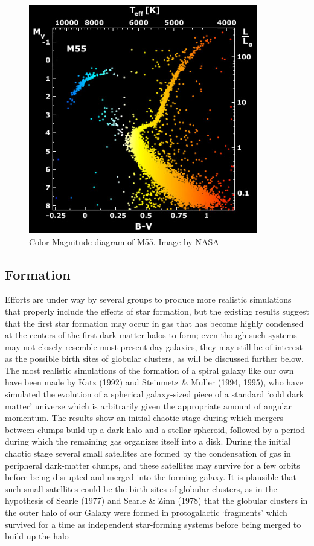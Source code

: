 \begin{figure}[H]
\centering
\includegraphics[width=10cm]{images/m55_diagram.jpg}
\caption{Color Magnitude diagram of M55. Image by NASA}
\end{figure}

\subsection{Formation}

Efforts are under way by several
groups to produce more realistic simulations that properly include the effects
of star formation, but the existing results suggest that the first star formation
may occur in gas that has become highly condensed at the centers of the first
dark-matter halos to form; even though such systems may not closely resemble
most present-day galaxies, they may still be of interest as the possible birth sites
of globular clusters, as will be discussed further below.
The most realistic simulations of the formation of a spiral galaxy like our
own have been made by Katz (1992) and Steinmetz \& Muller (1994, 1995),
who have simulated the evolution of a spherical galaxy-sized piece of a standard
‘cold dark matter’ universe which is arbitrarily given the appropriate amount
of angular momentum. The results show an initial chaotic stage during which
mergers between clumps build up a dark halo and a stellar spheroid, followed by
a period during which the remaining gas organizes itself into a disk. During the
initial chaotic stage several small satellites are formed by the condensation of
gas in peripheral dark-matter clumps, and these satellites may survive for a few
orbits before being disrupted and merged into the forming galaxy. It is plausible
that such small satellites could be the birth sites of globular clusters, as in the
hypothesis of Searle (1977) and Searle \& Zinn (1978) that the globular clusters
in the outer halo of our Galaxy were formed in protogalactic ‘fragments’ which
survived for a time as independent star-forming systems before being merged
to build up the halo

